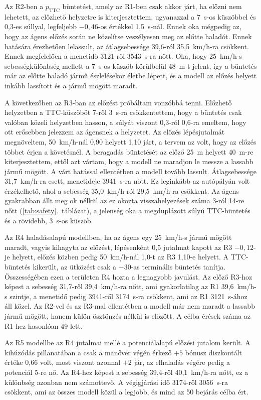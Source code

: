 \documentclass[a4paper,12pt,oneside]{article}
\begin{document}
Az R2-ben a $p_{\text{TTC}}$ büntetést, amely az R1-ben csak akkor járt, ha előzni nem lehetett, az előzhető helyzetre is kiterjesztettem, ugyanazzal a 7~s-os küszöbbel és 0,3-es súllyal, legfeljebb $-0{,}46$-os értékkel 1,5~s-nál.
Ennek oka mégpedig az, hogy az ágens előzés során ne közelítse veszélyesen meg az előtte haladót. 
Ennek hatására érezhetően lelassult, az átlagsebessége 39,6-ról 35,5~km/h-ra csökkent.
Ennek megfelelően a menetidő 3121-ről 3543~s-ra nőtt.
Oka, hogy 25~km/h-s sebességkülönbség mellett a 7~s-os küszöb körülbelül 48~m-t
jelent, így a büntetés már az előtte haladó jármű észlelésekor életbe lépett, és a modell az
előzés helyett inkább lassított és a jármű mögött maradt.

A következőben az R3-ban az előzést próbáltam vonzóbbá tenni. 
Előzhető helyzetben a TTC-küszöböt 7-ről 3~s-ra csökkentettem, hogy a büntetés 
csak valóban közeli helyzetben hasson, a súlyát viszont 0,3-ról 0,6-ra emeltem, 
hogy ott erősebben jelezzem az ágensnek a helyzetet. 
Az előzés lépésjutalmát megnöveltem, 50~km/h-nál 0,90 helyett 1,10 járt, a tervem az volt, hogy az 
előzés többet érjen a követésnél.
A beragadás büntetését az előző 25~m helyett 40~m-re kiterjesztettem, ettől azt vártam, hogy a 
modell ne maradjon le messze a lassabb jármű mögött. 
A várt hatással ellentétben a modell tovább lassult. 
Átlagsebessége 31,7~km/h-ra esett, menetideje 3941~s-ra nőtt.
Ez leginkább az autópályán volt érzékelhető, ahol a sebesség 35,0~km/h-ról 29,5~km/h-ra csökkent. 
Az ágens gyakrabban állt meg ok nélkül az ez okozta visszahelyezések  
száma 3-ról 14-re nőtt
(\ref{tab:safety}.~táblázat), a jelenség oka a megduplázott súlyú TTC-büntetés és a rövidebb, 3~s-os küszöb.

Az R4 haladásalapú modellben, ha az ágens egy 25~km/h-s jármű mögött maradt, vagyis kihagyta
az előzést, lépésenként 0,5 jutalmat kapott az R3 $-0{,}12$-je helyett, előzés közben pedig
50~km/h-nál 1,0-t az R3 1,10-e helyett. 
A TTC-büntetés kikerült, az ütközést csak a $-30$-as terminális büntetés
tanítja. 
Összességében ezen a területen R4 hozta a legnagyobb javulást. Az előző R3-hoz képest
a sebesség 31,7-ről 39,4~km/h-ra nőtt,
ami gyakorlatilag az R1 39,6~km/h-s szintje, a menetidő pedig 3941-ről 3174~s-ra csökkent,
ami az R1 3121~s-ához áll közel. Az R2-vel és az
R3-mal ellentétben a modell már nem maradt a lassabb jármű mögött, hanem külön ösztönzés
nélkül is előzött. A célba érések száma az R1-hez hasonlóan 49 lett.

Az R5 modellbe az R4 jutalmai mellé a potenciálalapú előzési jutalom került. 
A kihúzódás pillanatában a csak a manőver végén érkező $+5$ bónusz diszkontált értéke 0,66 volt, 
most viszont azonnal $+2$ jár, az elhaladás végére pedig a potenciál 5-re nő. 
Az R4-hez képest a sebesség 39,4-ről 40,1~km/h-ra nőtt, ez a különbség azonban nem
számottevő. A végigjárási idő 3174-ről 3056~s-ra csökkent, ami az összes modell közül a
legjobb, és mind az 50 bejárás célba ért.
\end{document}
